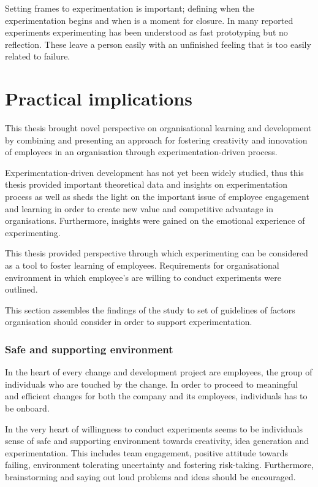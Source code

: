 Setting frames to experimentation is important; defining when the experimentation begins and when is a moment for closure. In many reported experiments experimenting has been understood as fast prototyping but no reflection. These leave a person easily with an unfinished feeling that is too easily related to failure. 

\section{Practical implications} \label{framework}
This thesis brought novel perspective on organisational learning and development by combining and presenting an approach for fostering creativity and innovation of employees in an organisation through experimentation-driven process. 

Experimentation-driven development has not yet been widely studied, thus this thesis provided important theoretical data and insights on experimentation process as well as sheds the light on the important issue of employee engagement and learning in order to create new value and competitive advantage in organisations. Furthermore, insights were gained on the emotional experience of experimenting.

This thesis provided perspective through which experimenting can be considered as a tool to foster learning of employees. Requirements for organisational environment in which employee's are willing to conduct experiments were outlined.

This section assembles the findings of the study to set of guidelines of factors organisation should consider in order to support experimentation.

\subsubsection*{Safe and supporting environment}
In the heart of every change and development project are employees, the group of individuals who are touched by the change. In order to proceed to meaningful and efficient changes for both the company and its employees, individuals has to be onboard. 

In the very heart of willingness to conduct experiments seems to be individuals sense of safe and supporting environment towards creativity, idea generation and experimentation. This includes team engagement, positive attitude towards failing, environment tolerating uncertainty and fostering risk-taking. Furthermore, brainstorming and saying out loud problems and ideas should be encouraged. 

